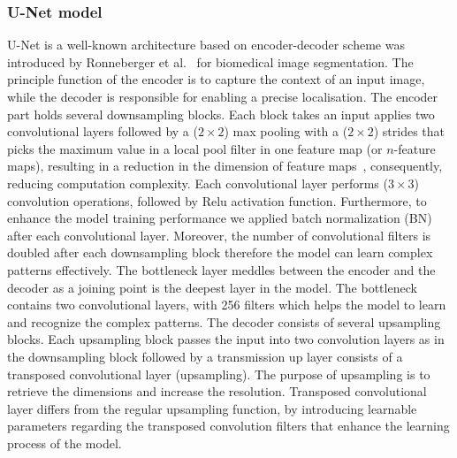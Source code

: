\subsubsection{U-Net model}
U-Net is a well-known architecture based on encoder-decoder scheme was introduced by Ronneberger et al.~\cite{Ronneberger2015} for biomedical image segmentation. 
The principle function of the encoder is to capture the context of an input image, while the decoder is responsible for enabling a precise localisation. 
The encoder part holds several downsampling blocks. 
Each block takes an input applies two convolutional layers followed by a (\(2\times2\)) max pooling with a (\(2\times2\)) strides that picks the maximum value in a local pool filter in one feature map (or \(n\)-feature maps), resulting in a reduction in the dimension of feature maps~\cite{Lecun2015}, consequently, reducing computation complexity.
Each convolutional layer performs (\(3\times3\)) convolution operations, followed by Relu activation function.
Furthermore, to enhance the model training performance we applied batch normalization (BN)~\cite{Ioffe2015} after each convolutional layer.
Moreover, the number of convolutional filters is doubled after each downsampling block therefore the model can learn complex patterns effectively. 
The bottleneck layer meddles between the encoder and the decoder as a joining point is the deepest layer in the model.
The bottleneck contains two convolutional layers, with 256 filters which helps the model to learn and recognize the complex patterns.
The decoder consists of several upsampling blocks. 
Each upsampling block passes the input into two convolution layers as in the downsampling block followed by a transmission up layer consists of a transposed convolutional layer (upsampling). 
The purpose of upsampling is to retrieve the dimensions and increase the resolution.
Transposed convolutional layer differs from the regular upsampling function, by introducing learnable parameters regarding the transposed convolution filters that enhance the learning process of the model. 
